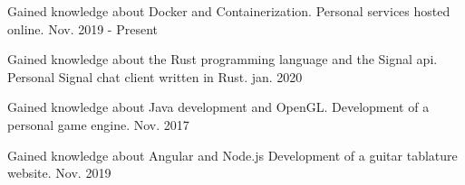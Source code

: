 

\begin{cventries}

  \cventry
    {Gained knowledge about Docker and Containerization.} %
    {Personal services hosted online.} %
    {} %
    {Nov. 2019 - Present} %
    {
    }

  \cventry
    {Gained knowledge about the Rust programming language and the Signal api.} %
    {Personal Signal chat client written in Rust.} %
    {} %
    {jan. 2020} %
    {
    }

  \cventry
    {Gained knowledge about Java development and OpenGL.} %
    {Development of a personal game engine.} %
    {} %
    {Nov. 2017} %
    {
    }

  \cventry
    {Gained knowledge about Angular and Node.js} %
    {Development of a guitar tablature website.} %
    {} %
    {Nov. 2019} %
    {
    }


\end{cventries}
